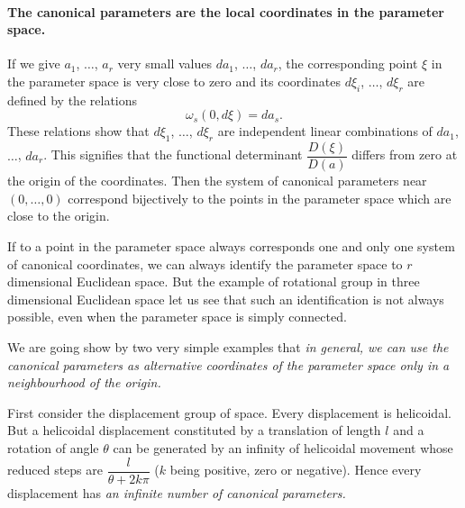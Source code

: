 \documentclass[leqno,11pt]{book}
\numberwithin{equation}{chapter}
\theoremstyle{shape1}
\theoremstyle{shapesmall}
\begin{document}
\paragraph{The canonical parameters are the local coordinates in the parameter space.}
\label{sec:201}
If we give $a_{1}$, $\dots$, $a_{r}$ very small values $da_{1}$, $\dots$, $da_{r}$, the corresponding point $\xi$ in the parameter space is very close to zero and its coordinates $d\xi_{i}$, $\dots$, $d\xi_{r}$ are defined by the relations
\begin{equation}
  \label{eq:13.11}
  \omega_{s}(0,d\xi)=da_{s}.
\end{equation}
These relations show that $d\xi_{1}$, $\dots$, $d\xi_{r}$ are independent linear combinations of $da_{1}$, $\dots$, $da_{r}$. This signifies that the functional determinant $\dfrac{D(\xi)}{D(a)}$ differs from zero at the origin of the coordinates. Then the system of canonical parameters near $(0,\dots,0)$ correspond bijectively to the points in the parameter space which are close to the origin.

If to a point in the parameter space always corresponds one and only one system of canonical coordinates, we can always identify the parameter space to $r$ dimensional Euclidean space. But the example of rotational group in three dimensional Euclidean space let us see that such an identification is not always possible, even when the parameter space is simply connected.

We are going show by two very simple examples that \emph{in general, we can use the canonical parameters as alternative coordinates of the parameter space only in a neighbourhood of the origin.}

First consider the displacement group of space. Every displacement is helicoidal. But a helicoidal displacement constituted by a translation of length $l$ and a rotation of angle $\theta$ can be generated by an infinity of helicoidal movement whose reduced steps are $\dfrac{l}{\theta+2k\pi}$ ($k$ being positive, zero or negative). Hence every displacement has \emph{an infinite number of canonical parameters.}
\end{document}

